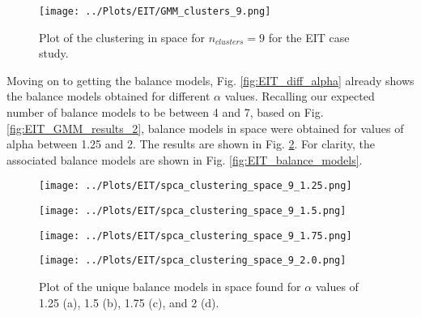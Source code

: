 \documentclass[12pt]{report} %
\begin{document}
\begin{figure}[htbp]
  \centering
  \texttt{[image: ../Plots/EIT/GMM\_clusters\_9.png]}
  \caption{Plot of the clustering in space for $n_{clusters}=9$ for the EIT case study.}
  \label{fig:EIT_clustering}
\end{figure}

Moving on to getting the balance models, Fig. \ref{fig:EIT_diff_alpha} already shows the balance models obtained for different $\alpha$ values. Recalling our expected number of balance models to be between 4 and 7, based on Fig. \ref{fig:EIT_GMM_results_2}, balance models in space were obtained for values of alpha between 1.25 and 2. The results are shown in Fig. \ref{fig:EIT_balance_models_space}. For clarity, the associated balance models are shown in Fig. \ref{fig:EIT_balance_models}.

\begin{figure}[htbp]
  \centering
  \begin{minipage}{0.75\textwidth}
    \centering
    \texttt{[image: ../Plots/EIT/spca\_clustering\_space\_9\_1.25.png]}
    \subcaption{}
  \end{minipage}

  \begin{minipage}{0.75\textwidth}
    \centering
    \texttt{[image: ../Plots/EIT/spca\_clustering\_space\_9\_1.5.png]}
    \subcaption{}
  \end{minipage}

  \begin{minipage}{0.75\textwidth}
    \centering
    \texttt{[image: ../Plots/EIT/spca\_clustering\_space\_9\_1.75.png]}
    \subcaption{}
  \end{minipage}

  \begin{minipage}{0.75\textwidth}
    \centering
    \texttt{[image: ../Plots/EIT/spca\_clustering\_space\_9\_2.0.png]}
    \subcaption{}
  \end{minipage}

  \caption{Plot of the unique balance models in space found for $\alpha$ values of 1.25 (a), 1.5 (b), 1.75 (c), and 2 (d).}
  \label{fig:EIT_balance_models_space}
\end{figure}
\end{document}

